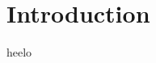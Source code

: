 \documentclass[a4paper, 12pt]{report} %
\begin{document}
    \vspace{-0.8cm}
    \begin{abstract}
       
    \end{abstract}
    \pagebreak
    \tableofcontents
    \pagebreak
    \listoffigures
    \pagebreak
    \listoftables
    \pagebreak
    \setcounter{page}{1}

    \section{Introduction}
    heelo

    
\end{document}
